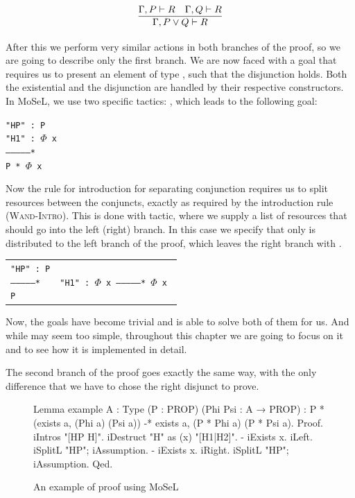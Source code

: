 \[\infer{\Gamma, P \vee Q \vdash R}
        {\Gamma, P \vdash R &
         \Gamma, Q \vdash R }\]

After this we perform very similar actions in both branches of the proof, so we are going to describe only the first branch.
We are now faced with a goal that requires us to present an element of type , such that the disjunction holds.
Both the existential and the disjunction are handled by their respective constructors.
In MoSeL, we use two specific tactics: , which leads to the following goal:

\begin{minipage}[t]{\linewidth}
\texttt{"HP" : P\\
"H1" : $\Phi$ x\\
--------------*\\
P * $\Phi$ x}
\end{minipage}

Now the rule for introduction for separating conjunction requires us to split resources between the conjuncts, exactly as required by the introduction rule (\textsc{Wand-Intro}).
This is done with  tactic, where we supply a list of resources that should go into the left (right) branch.
In this case we specify that only  is distributed to the left branch of the proof, which leaves the right branch with .

\begin{minipage}[t]{\linewidth}
\begin{tabular}{l l}
  \parbox[t]{0.5\textwidth}{\texttt{"HP" : P\\
  ---------------*\\
  P}} &
  \parbox[t]{0.5\textwidth}{\texttt{"H1" : $\Phi$ x\\
  ---------------*\\
  $\Phi$ x }}
\end{tabular}
\end{minipage}


Now, the goals have become trivial and  is able to solve both of them for us.
And while  may seem too simple, throughout this chapter we are going to focus on it and to see how it is implemented in detail.

The second branch of the proof goes exactly the same way, with the only difference that we have to chose the right disjunct to prove.

\begin{figure}
\begin{coq}
Lemma example {A : Type} (P : PROP) (Phi Psi : A → PROP) :
  P * (exists a, (Phi a) \/ (Psi a)) -* exists a, (P * Phi a) \/ (P * Psi a).
Proof.
  iIntros "[HP H]".
  iDestruct "H" as (x) "[H1|H2]".
  - iExists x. iLeft. iSplitL "HP"; iAssumption.
  - iExists x. iRight. iSplitL "HP"; iAssumption.
Qed.
\end{coq}
  \caption{An example of proof using MoSeL}
  \label{fig:mosel-example-full}
\end{figure}

